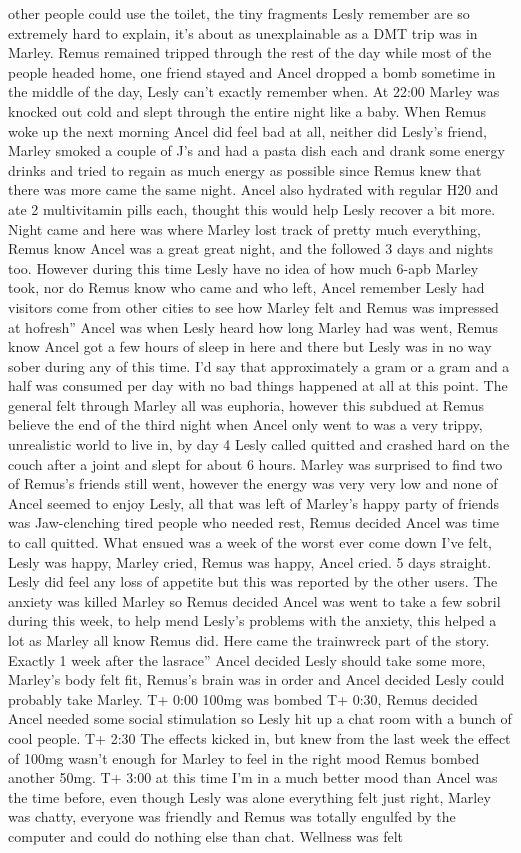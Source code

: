 \documentclass[12pt]{book}
\begin{document}
other people could use the toilet, the tiny fragments Lesly remember are so extremely hard to explain, it's about as unexplainable as a DMT trip was in Marley. Remus remained tripped through the rest of the day while most of the people headed home, one friend stayed and Ancel dropped a bomb sometime in the middle of the day, Lesly can't exactly remember when. At 22:00 Marley was knocked out cold and slept through the entire night like a baby. When Remus woke up the next morning Ancel did feel bad at all, neither did Lesly's friend, Marley smoked a couple of J's and had a pasta dish each and drank some energy drinks and tried to regain as much energy as possible since Remus knew that there was more came the same night. Ancel also hydrated with regular H20 and ate 2 multivitamin pills each, thought this would help Lesly recover a bit more. Night came and here was where Marley lost track of pretty much everything, Remus know Ancel was a great great night, and the followed 3 days and nights too. However during this time Lesly have no idea of how much 6-apb Marley took, nor do Remus know who came and who left, Ancel remember Lesly had visitors come from other cities to see how Marley felt and Remus was impressed at hofresh'' Ancel was when Lesly heard how long Marley had was went, Remus know Ancel got a few hours of sleep in here and there but Lesly was in no way sober during any of this time. I'd say that approximately a gram or a gram and a half was consumed per day with no bad things happened at all at this point. The general felt through Marley all was euphoria, however this subdued at Remus believe the end of the third night when Ancel only went to was a very trippy, unrealistic world to live in, by day 4 Lesly called quitted and crashed hard on the couch after a joint and slept for about 6 hours. Marley was surprised to find two of Remus's friends still went, however the energy was very very low and none of Ancel seemed to enjoy Lesly, all that was left of Marley's happy party of friends was Jaw-clenching tired people who needed rest, Remus decided Ancel was time to call quitted. What ensued was a week of the worst ever come down I've felt, Lesly was happy, Marley cried, Remus was happy, Ancel cried. 5 days straight. Lesly did feel any loss of appetite but this was reported by the other users. The anxiety was killed Marley so Remus decided Ancel was went to take a few sobril during this week, to help mend Lesly's problems with the anxiety, this helped a lot as Marley all know Remus did. Here came the trainwreck part of the story. Exactly 1 week after the lasrace'' Ancel decided Lesly should take some more, Marley's body felt fit, Remus's brain was in order and Ancel decided Lesly could probably take Marley. T+ 0:00 100mg was bombed T+ 0:30, Remus decided Ancel needed some social stimulation so Lesly hit up a chat room with a bunch of cool people. T+ 2:30 The effects kicked in, but knew from the last week the effect of 100mg wasn't enough for Marley to feel in the right mood Remus bombed another 50mg. T+ 3:00 at this time I'm in a much better mood than Ancel was the time before, even though Lesly was alone everything felt just right, Marley was chatty, everyone was friendly and Remus was totally engulfed by the computer and could do nothing else than chat. Wellness was felt 
\end{document}
